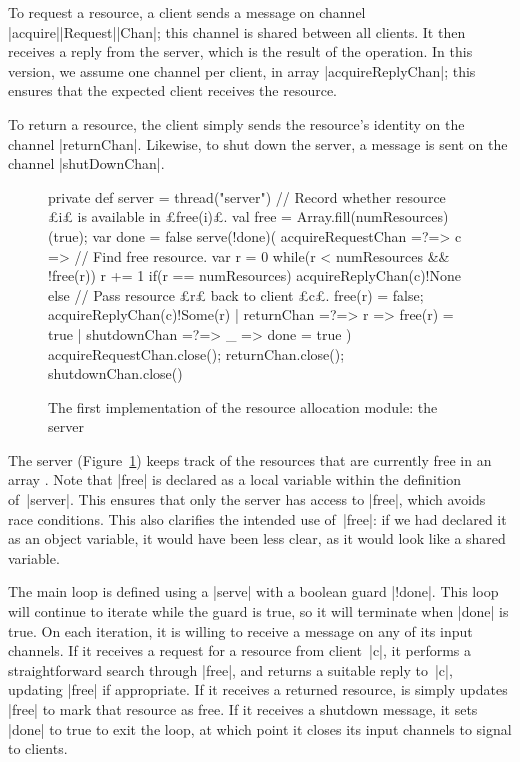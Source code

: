 
To request a resource, a client sends a message on channel
|acquire|\-|Request|\-|Chan|; this channel is shared between all clients.  It
then receives a reply from the server, which is the result of the operation.
In this version, we assume one channel per client, in array
|acquireReplyChan|; this ensures that the expected client receives the
resource.

To return a resource, the client simply sends the resource's identity on the
channel |returnChan|.  Likewise, to shut down the server, a message is sent on
the channel |shutDownChan|.


\begin{figure}
\begin{scala}
  private def server = thread("server"){
    // Record whether resource £i£ is available in £free(i)£.
    val free = Array.fill(numResources)(true); var done = false
    serve(!done)(
      acquireRequestChan =?=> { c => 
	// Find free resource.
	var r = 0
	while(r < numResources && !free(r)) r += 1
	if(r == numResources) acquireReplyChan(c)!None
        else{  // Pass resource £r£ back to client £c£.
	  free(r) = false; acquireReplyChan(c)!Some(r)
        }
      }
      | returnChan =?=> { r => free(r) = true }
      | shutdownChan =?=> { _ => done = true }
    )
    acquireRequestChan.close(); returnChan.close(); shutdownChan.close()
  }
\end{scala}
\caption{The first implementation of the resource allocation module: the
  server}
\label{fig:RAServer1-2}
\end{figure}


The server (Figure~\ref{fig:RAServer1-2}) keeps track of the resources that are
currently free in an array .  Note that |free| is declared as a
local variable within the definition of~|server|.  This ensures that only the
server has access to |free|, which avoids race conditions. This also clarifies
the intended use of~|free|: if we had declared it as an object variable, it
would have been less clear, as it would look like a shared variable.

The main loop is defined using a |serve| with a boolean guard |!done|.  This
loop will continue to iterate while the guard is true, so it will terminate
when |done| is true.  On each iteration, it is willing to receive a message on
any of its input channels.  If it receives a request for a resource from
client~|c|, it performs a straightforward search through |free|, and returns a
suitable reply to~|c|, updating |free| if appropriate.  If it receives a
returned resource, is simply updates |free| to mark that resource as free.  If
it receives a shutdown message, it sets |done| to true to exit the loop, at
which point it closes its input channels to signal to clients.

